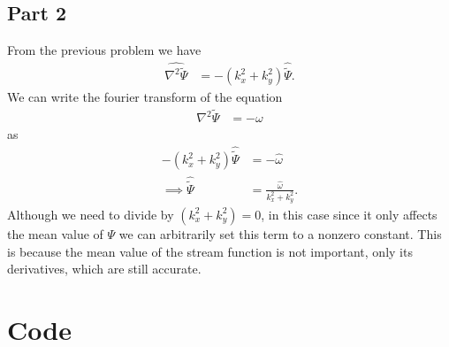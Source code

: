 \documentclass{article}
\begin{document}
\subsection{Part 2}
From the previous problem we have
\begin{align}
    \widehat{\nabla^2 \tilde{\Psi}} &= -(k^2_x + k^2_y) \hat{\tilde{\Psi}}.
\end{align}
We can write the fourier transform of the equation
\begin{align}
    \nabla^2 \tilde{\Psi} &= -\omega
\end{align}
as
\begin{align}
    -(k^2_x + k^2_y) \hat{\tilde{\Psi}} &= -\hat{\omega} \\
\implies \hat{\tilde{\Psi}} &= \frac{\hat{\omega}}{k^2_x + k^2_y}.
\end{align}
Although we need to divide by $(k^2_x + k^2_y) = 0$, in this case since it only affects the mean value of $\Psi$ we can arbitrarily set this term to a nonzero constant.
This is because the mean value of the stream function is not important, only its derivatives, which are still accurate.

\clearpage
\appendix
\section{Code}
% 
\end{document}
